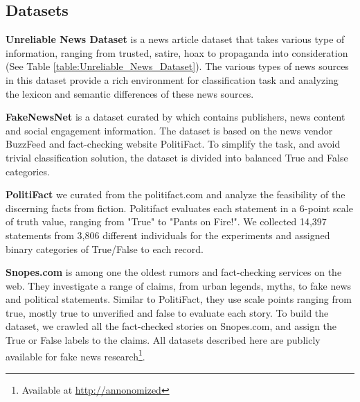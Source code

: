 \subsection{Datasets}
\textbf{Unreliable News Dataset} \cite{Rashkin2017TruthOV} is a news article dataset that takes various type of information, ranging from trusted, satire, hoax to propaganda into consideration (See Table \ref{table:Unreliable_News_Dataset}). The various types of news sources in this dataset provide a rich environment for classification task and analyzing the lexicon and semantic differences of these news sources.   

\textbf{FakeNewsNet} is a dataset curated by \citet{shu2018} which contains publishers, news content and social engagement information. The dataset is based on the news vendor BuzzFeed and fact-checking website PolitiFact. To simplify the task, and avoid trivial classification solution, the dataset is divided into balanced True and False categories.   

\textbf{PolitiFact} we curated from the politifact.com and analyze the feasibility of the discerning facts from fiction. Politifact evaluates each statement in a 6-point scale of truth value, ranging from "True" to "Pants on Fire!". We collected 14,397 statements from 3,806 different individuals for the experiments and assigned binary categories of True/False to each record. 

\textbf{Snopes.com} is among one the oldest rumors and fact-checking services on the web. They investigate a range of claims, from urban legends, myths, to fake news and political statements. Similar to PolitiFact, they use scale points ranging from true, mostly true to unverified and false to evaluate each story. To build the dataset, we crawled all the fact-checked stories on Snopes.com, and assign the True or False labels to the claims. All datasets described here are publicly available for fake news research\footnote{Available at \url{http://annonomized}}. 
 
